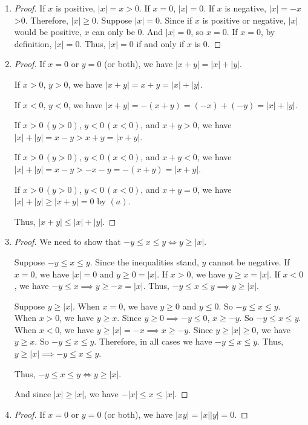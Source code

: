 \documentclass[12pt, letter]{article}
\begin{document}
\begin{enumerate}[label=(\alph*)]
    \item \begin{proof}
        If $x$ is positive, $|x|=x>0$. If $x=0$, $|x|=0$. If $x$ is negative, $|x|=-x$>0. Therefore, $|x|\geq 0$. Suppose $|x|=0$. Since if $x$ is positive or negative, 
        $|x|$ would be positive, $x$ can only be 0. And $|x|=0$, so $x=0$. If $x=0$, by definition, $|x|=0$. Thus, $|x|=0$ if and only if $x$ is 0. 
    \end{proof}
    \item \begin{proof}
    If $x=0$ or $y=0$ (or both), we have $|x+y|=|x|+|y|$.

    If $x>0$, $y>0$, we have $|x+y|=x+y=|x|+|y|$.

    If $x<0$, $y<0$, we have $|x+y|=-(x+y)=(-x)+(-y)=|x|+|y|$.

    If $x>0\,(y>0)$, $y<0\,(x<0)$, and $x+y>0$, we have $|x|+|y|=x-y>x+y=|x+y|$.

    If $x>0\,(y>0)$, $y<0\,(x<0)$, and $x+y<0$, we have $|x|+|y|=x-y>-x-y=-(x+y)=|x+y|$.

    If $x>0\,(y>0)$, $y<0\,(x<0)$, and $x+y=0$, we have $|x|+|y|\geq |x+y|=0$ by $(a)$.

    Thus, $|x+y|\leq |x|+|y|$.
    \end{proof}
    \item \begin{proof}
        We need to show that $-y\leq x\leq y\iff y\geq |x|$. 

        Suppose $-y\leq x\leq y$. Since the inequalities stand, $y$ cannot be negative. If $x=0$, we have $|x|=0$ and $y\geq 0=|x|$.
        If $x>0$, we have $y\geq x=|x|$. If $x<0$, we have $-y\leq x\implies y\geq -x=|x|$. Thus, $-y\leq x\leq y\implies y\geq |x|$.

        Suppose $y\geq |x|$. When $x=0$, we have $y\geq 0$ and $y\leq 0$. So $-y\leq x\leq y$. When $x>0$, we have $y\geq x$. Since $y\geq 0\implies -y\leq 0$, $x\geq -y$. So 
        $-y\leq x\leq y$. When $x<0$, we have $y\geq |x|=-x\implies x\geq -y$. Since $y\geq |x|\geq 0$, we have $y\geq x$. So $-y\leq x\leq y$. 
        Therefore, in all cases we have $-y\leq x\leq y$. Thus, $y\geq |x|\implies -y\leq x\leq y$.

        Thus, $-y\leq x\leq y\iff y\geq |x|$.
        
        And since $|x|\geq |x|$, we have $-|x|\leq x\leq |x|$.
    \end{proof}
    \item \begin{proof}
        If $x=0$ or $y=0$ (or both), we have $|xy|=|x||y|=0$.


\end{proof}
\end{enumerate}
\end{document}

